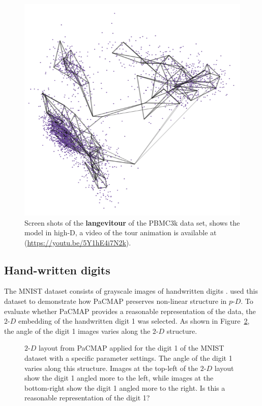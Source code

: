 \documentclass[
  12pt]{article}
\newcommand\pD{$p\text{-}D$}
\newcommand\gD{$2\text{-}D$}
\begin{document}
\begin{figure}[H]
%
\begin{minipage}{0.33\linewidth}
\includegraphics{figures/pbmc3k/sc_6.png}\end{minipage}%

\caption{\label{fig-pbmc2-sc}Screen shots of the \textbf{langevitour} of
the PBMC3k data set, shows the model in high-D, a video of the tour
animation is available at (\url{https://youtu.be/5Y1hE4i7N2k}).}

\end{figure}%

\subsection{Hand-written digits}\label{hand-written-digits}

The MNIST dataset consists of grayscale images of handwritten digits
\citep{lecun2010}. \citet{yingfan2021} used this dataset to demonstrate
how PaCMAP preserves non-linear structure in \pD{}. To evaluate whether
PaCMAP provides a reasonable representation of the data, the \gD{}
embedding of the handwritten digit 1 was selected. As shown in
Figure~\ref{fig-pacmap-author}, the angle of the digit 1 images varies
along the \gD{} structure.

\begin{figure}[H]


\caption{\label{fig-pacmap-author}\(2\text{-}D\) layout from PaCMAP
applied for the digit 1 of the MNIST dataset with a specific parameter
settings. The angle of the digit 1 varies along this structure. Images
at the top-left of the \(2\text{-}D\) layout show the digit 1 angled
more to the left, while images at the bottom-right show the digit 1
angled more to the right. Is this a reasonable representation of the
digit 1?}

\end{figure}%
\end{document}
